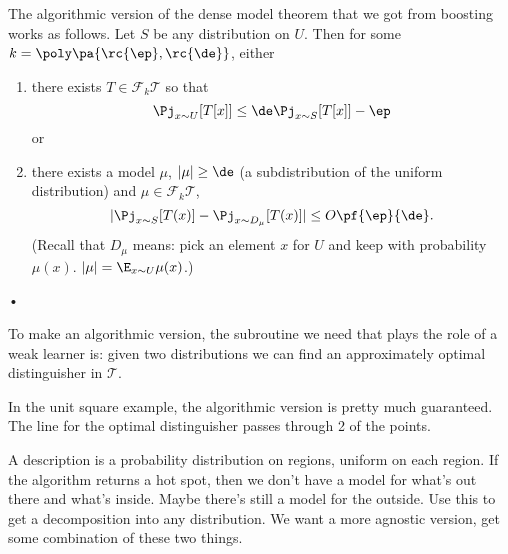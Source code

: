 The algorithmic version of the dense model theorem that we got from boosting works as follows. Let $S$ be any distribution on $U$. Then for some $k=\poly\pa{\rc{\ep},\rc{\de}}$,
either 
\begin{enumerate}
\item
there exists $ T\in \mathcal F_k\mathcal T$ so that 
$$
\Pj_{x\sim U} [T[x]] \le \de\Pj_{x\sim S}[T[x]] - \ep
$$
or
\item
there exists a model $\mu$, $|\mu|\ge \de$ (a subdistribution of the uniform distribution) %
and $\mu\in \mathcal F_k\mathcal T$,
$$
|\Pj_{x\sim S} [T(x)] - \Pj_{x\sim D_\mu}[T(x)]|\le O\pf{\ep}{\de}.
$$
(Recall that $D_\mu$ means: pick an element $x$ for $U$ and keep with probability $\mu(x)$. $|\mu|=\E_{x\sim U}\mu(x)$.)
\end{enumerate}•

To make an algorithmic version, the subroutine we need that plays the role of a weak learner is: given two distributions we can find an approximately optimal distinguisher in $\mathcal T$.

In the unit square example, the algorithmic version is pretty much guaranteed. The line for the optimal distinguisher passes through 2 of the points. %

A description is a probability distribution on regions,  uniform on each region. If the algorithm returns a hot spot, then we don't have a model for what's out there and what's inside. Maybe there's still a model for the outside. Use this to get a decomposition into any distribution. We want a more agnostic version, get some combination of these two things.

